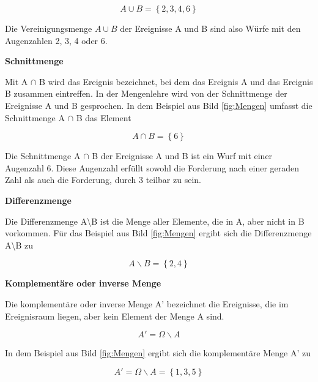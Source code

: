 \begin{equation}\label{eq:twoeleven}
A\cup B=\left\{2, 3, 4, 6\right\}
\end{equation}

\noindent Die Vereinigungsmenge $A \cup B$ der Ereignisse A und B sind also W\"{u}rfe mit den Augenzahlen 2, 3, 4 oder 6. \bigskip

{\selectfont
\noindent\textbf{Schnittmenge}} \smallskip

\noindent Mit A $\cap$ B wird das Ereignis bezeichnet, bei dem das Ereignis A und das Ereignis B zusammen eintreffen. In der Mengenlehre wird von der Schnittmenge der Ereignisse A und B gesprochen. In dem Beispiel aus Bild \ref{fig:Mengen} umfasst die Schnittmenge A $\cap$ B das Element 

\begin{equation}\label{eq:twotwelve}
A\cap B=\left\{6\right\}
\end{equation}

\noindent Die Schnittmenge A $\cap$ B der Ereignisse A und B ist ein Wurf mit einer Augenzahl 6. Diese Augenzahl erf\"{u}llt sowohl die Forderung nach einer geraden Zahl als auch die Forderung, durch 3 teilbar zu sein. \bigskip

{\selectfont
\noindent\textbf{Differenzmenge}} \smallskip

\noindent Die Differenzmenge A{\textbackslash}B ist die Menge aller Elemente, die in A, aber nicht in B vorkommen. F\"{u}r das Beispiel aus Bild \ref{fig:Mengen} ergibt sich die Differenzmenge A{\textbackslash}B zu

\begin{equation}\label{eq:twothirteen}
A\backslash B=\left\{2, 4\right\}
\end{equation}

{\selectfont
\noindent\textbf{Komplement\"{a}re oder inverse Menge}} \smallskip

\noindent Die komplement\"{a}re oder inverse Menge A' bezeichnet die Ereignisse, die im Ereignisraum liegen, aber kein Element der Menge A sind. 

\begin{equation}\label{eq:twofourteen}
A'=\Omega \backslash A
\end{equation}

\noindent In dem Beispiel aus Bild \ref{fig:Mengen} ergibt sich die komplement\"{a}re Menge A' zu

\begin{equation}\label{eq:twofifteen}
A'=\Omega \backslash A=\left\{1, 3, 5\right\}
\end{equation}


